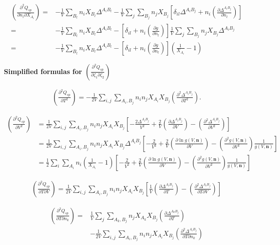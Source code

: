 \documentclass[10pt, a4paper]{article}
\newcommand{\mbf}[0]{\mathbf}
\newcommand*{\pder}[2]{\left(\frac{\partial #1}{\partial #2}\right)}
\newcommand*{\pdder}[2]{\left(\frac{\partial^2 #1}{\partial #2^2}\right)}
\newcommand*{\pdcross}[3]{\left(\frac{\partial^2 #1}{\partial #2 \partial #3}\right)}
\newcommand{\z}{\zeta}
\newcommand{\lp}{\left(}
\newcommand{\rp}{\right)}
\begin{document}
\begin{align*}
  \pdcross{Q_{sp}}{n_l}{X_{A_i}} =& - \frac{1}{V} \sum_{B_l} n_i X_{B_l} \Delta^{A_i B_l} - \frac{1}{V} \sum_{j} \sum_{B_j} n_j X_{B_j} \left[\delta_{il} \Delta^{A_i B_j} + n_i \pder{\Delta^{A_i B_j}}{n_l} \right] \\
  =& - \frac{1}{V} \sum_{B_l} n_i X_{B_l} \Delta^{A_i B_l} - \left[\delta_{il} + n_i \pder{g}{n_l} \right] \frac{1}{V} \sum_{j} \sum_{B_j} n_j X_{B_j} \Delta^{A_i B_j} \\
  =& - \frac{1}{V} \sum_{B_l} n_i X_{B_l} \Delta^{A_i B_l} - \left[\delta_{il} + n_i \pder{g}{n_l} \right] \lp \frac{1}{X_{A_i}} - 1 \rp
\end{align*}

\textbf{Simplified formulas for $\pdcross{Q_{sp}}{\z_1}{\z_2}$}

\begin{align*}
  \pdder{Q_{sp}}{T} =  - \frac{1}{2V} \sum_{i,j} \sum_{A_i, B_j} n_i n_j X_{A_i} X_{B_j} \pdder{\Delta^{A_i B_j}}{T}.
\end{align*}


\begin{align*} %
  \pdder{Q_{sp}}{V} &= \frac{1}{2V} \sum_{i,j} \sum_{A_i, B_j} n_i n_j X_{A_i} X_{B_j} \left[ -\frac{2\Delta^{A_i B_j}}{V^2} + \frac{2}{V}  \pder{\Delta^{A_i B_j}}{V}  - \pdder{\Delta^{A_i B_j}}{V} \right] \\
  &= \frac{1}{2V} \sum_{i,j} \sum_{A_i, B_j} n_i n_j X_{A_i} X_{B_j} \Delta^{A_i B_j} \left[ -\frac{2}{V^2} + \frac{2}{V} \pder{\ln g(V,\mbf n)}{V} - \pdder{g(V,\mbf n)}{V}  \frac{1}{g(V,\mbf n)} \right] \\
  &= \frac{1}{2} \sum_{i} \sum_{A_i} n_i \lp \frac{1}{X_{A_i}}-1 \rp \left[ -\frac{2}{V^2} + \frac{2}{V} \pder{\ln g(V,\mbf n)}{V} -  \pdder{g(V,\mbf n)}{V}  \frac{1}{g(V,\mbf n)} \right]
\end{align*}


\begin{align*}
  \pdcross{Q_{sp}}{T}{V} = \frac{1}{2V} \sum_{i,j} \sum_{A_i, B_j} n_i n_j X_{A_i} X_{B_j} \left[ \frac{1}{V} \pder{\Delta^{A_i B_j}}{T} - \pdcross{\Delta^{A_i B_j}}{T}{V} \right]
\end{align*}


\begin{align*}
  \pdcross{Q_{sp}}{T}{n_k} =& \frac{1}{V} \sum_{j} \sum_{A_k,B_j} n_j X_{A_k} X_{B_j} \pder{\Delta^{A_k B_j}}{T}\\
  &- \frac{1}{2V} \sum_{i,j} \sum_{A_i, B_j} n_i n_j X_{A_i} X_{B_j} \pdcross{\Delta^{A_i B_j}}{T}{n_k}
\end{align*}
\end{document}
